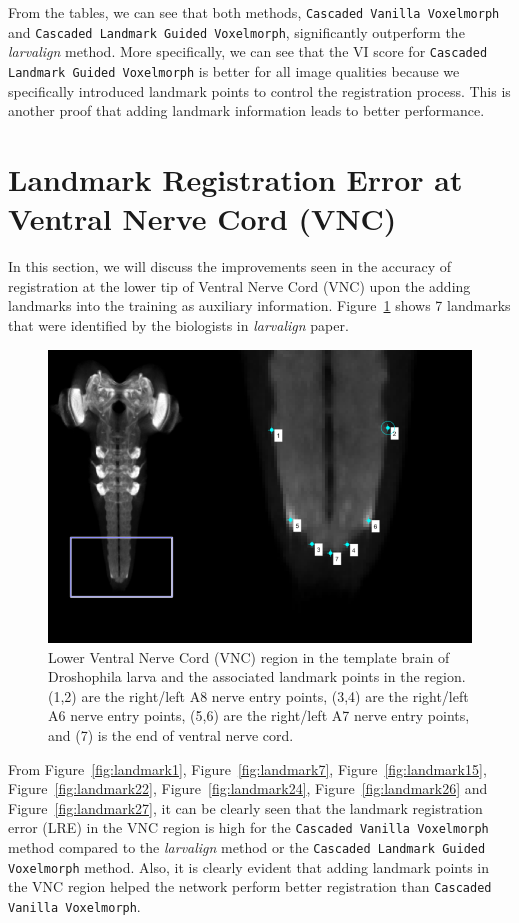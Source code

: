 \documentclass{book}
\begin{document}
	From the tables, we can see that both methods, \texttt{Cascaded Vanilla Voxelmorph} and \texttt{Cascaded Landmark Guided Voxelmorph}, significantly outperform the \textit{larvalign} method. More specifically, we can see that the VI score for \texttt{Cascaded Landmark Guided Voxelmorph} is better for all image qualities because we specifically introduced landmark points to control the registration process. This is another proof that adding landmark information leads to better performance.
	
	\section{Landmark Registration Error at Ventral Nerve Cord (VNC)}
	In this section, we will discuss the improvements seen in the accuracy of registration at the lower tip of Ventral Nerve Cord (VNC) upon the adding landmarks into the training as auxiliary information. Figure~\ref{fig:vnc} shows 7 landmarks that were identified by the biologists in \textit{larvalign} paper.
	
	\begin{figure}[h!]
		\centering
		\includegraphics[width=0.9\columnwidth]{resources/chapter7/VNC.png}
		\caption{Lower Ventral Nerve Cord (VNC) region in the template brain of Droshophila larva and the associated landmark points in the region. (1,2) are the right/left A8 nerve entry points, (3,4) are the right/left A6 nerve entry points, (5,6) are the right/left A7 nerve entry points, and (7) is the end of ventral nerve cord.}
		\label{fig:vnc}
	\end{figure}
	
	From Figure~\ref{fig:landmark1}, Figure~\ref{fig:landmark7}, Figure~\ref{fig:landmark15}, Figure~\ref{fig:landmark22}, Figure~\ref{fig:landmark24}, Figure~\ref{fig:landmark26} and Figure~\ref{fig:landmark27}, it can be clearly seen that the landmark registration error (LRE) in the VNC region is high for the \texttt{Cascaded Vanilla Voxelmorph} method compared to the \textit{larvalign} method or the \texttt{Cascaded Landmark Guided Voxelmorph} method. Also, it is clearly evident that adding landmark points in the VNC region helped the network perform better registration than \texttt{Cascaded Vanilla Voxelmorph}.
	
\end{document}
